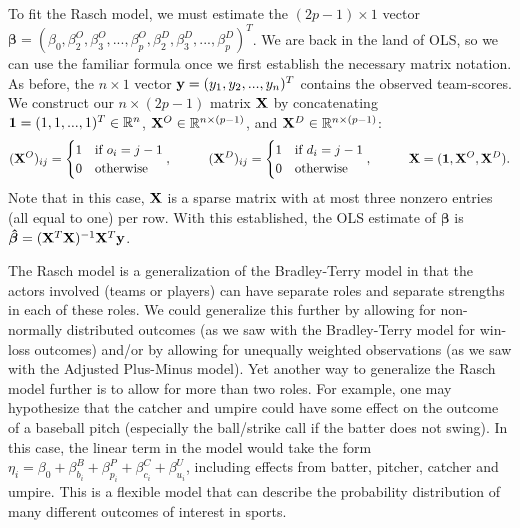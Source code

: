 \documentclass{article}
\begin{document}
  To fit the Rasch model, we must estimate the $(2p - 1) \times 1$ vector $\boldsymbol{\beta} = (\beta_0, \beta^O_2, \beta^O_3, ..., \beta^O_p, \beta^D_2, \beta^D_3, ..., \beta^D_p)^T$. We are back in the land of OLS, so we can use the familiar formula once we first establish the necessary matrix notation. As before, the $n \times 1$ vector ${\bf y} = (y_1, y_2, ..., y_n)^T$ contains the observed team-scores. We construct our $n \times (2p - 1)$ matrix $\bf X$ by concatenating ${\bf 1} = (1, 1, ..., 1)^T \in \mathbb{R}^n$, ${\bf X}^O \in \mathbb{R}^{n \times (p - 1)}$, and ${\bf X}^D \in \mathbb{R}^{n \times (p - 1)}$:
  \begin{equation*}
    ({\bf X}^O)_{ij} = \begin{cases}
      1 & \mbox{if $o_i = j - 1$}\\
      0 & \mbox{otherwise}
    \end{cases},
    \hspace{1cm}
    ({\bf X}^D)_{ij} = \begin{cases}
      1 & \mbox{if $d_i = j - 1$}\\
      0 & \mbox{otherwise}
    \end{cases},
    \hspace{1cm}
    {\bf X} = ({\bf 1}, {\bf X}^O, {\bf X}^D).
  \end{equation*}
  Note that in this case, ${\bf X}$ is a sparse matrix with at most three nonzero entries (all equal to one) per row. With this established, the OLS estimate of $\boldsymbol{\beta}$ is $\boldsymbol{\hat\beta} = ({\bf X}^T{\bf X})^{-1}{\bf X}^T{\bf y}$.

  The Rasch model is a generalization of the Bradley-Terry model in that the actors involved (teams or players) can have separate roles and separate strengths in each of these roles. We could generalize this further by allowing for non-normally distributed outcomes (as we saw with the Bradley-Terry model for win-loss outcomes) and/or by allowing for unequally weighted observations (as we saw with the Adjusted Plus-Minus model). Yet another way to generalize the Rasch model further is to allow for more than two roles. For example, one may hypothesize that the catcher and umpire could have some effect on the outcome of a baseball pitch (especially the ball/strike call if the batter does not swing). In this case, the linear term in the model would take the form $\eta_i = \beta_0 + \beta^B_{b_i} + \beta^P_{p_i} + \beta^C_{c_i} + \beta^U_{u_i}$, including effects from batter, pitcher, catcher and umpire. This is a flexible model that can describe the probability distribution of many different outcomes of interest in sports.
\end{document}
